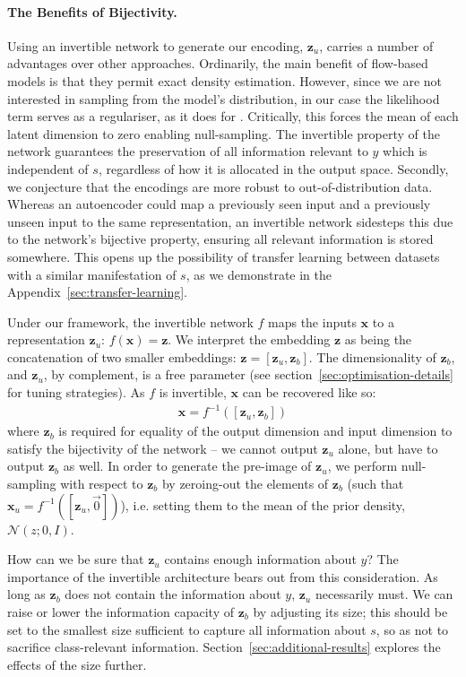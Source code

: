 \paragraph{The Benefits of Bijectivity.}
Using an invertible network to generate our encoding, $\bm{z}_u$, carries a number of advantages over other approaches.
Ordinarily, the main benefit of flow-based models is that they permit exact density estimation. 
However, since we are not interested in sampling from the model's distribution, in our case the likelihood term serves as a regulariser, as it does for  \citet{JacSmeOya18}. 
Critically, this forces the mean of each latent dimension to zero enabling null-sampling. 
The invertible property of the network guarantees the preservation of all information relevant to $y$ which is independent of $s$, regardless of how it is allocated in the output space.
Secondly, we conjecture that the encodings are more robust to out-of-distribution data.
Whereas an autoencoder could map a previously seen input and a previously unseen input to the same representation,
an invertible network sidesteps this due to the network's bijective property, ensuring all relevant information is stored somewhere. This opens up the possibility of transfer learning between datasets with a similar manifestation of $s$, as we demonstrate in the Appendix~\ref{sec:transfer-learning}.

Under our framework, the invertible network $f$ maps the inputs $\bm{x}$ to a representation $\bm{z}_u$:
$f(\bm{x}) = \bm{z}$.
We interpret the embedding $\bm{z}$ as being the concatenation of two smaller embeddings: $\bm{z} = [\bm{z}_u, \bm{z}_b]$.
The dimensionality of $\bm{z}_b$, and $\bm{z}_u$, by complement, is a free parameter (see section~\ref{sec:optimisation-details} for tuning strategies).
As $f$ is invertible, $\bm{x}$ can be recovered like so:
\begin{align}
  \bm{x} = f^{-1}([\bm{z}_u, \bm{z}_b])
  \label{eq:zreconstruct}
\end{align}
where $\bm{z}_b$ is required for equality of the output dimension and input dimension to satisfy the bijectivity of the network -- we cannot output $\bm{z}_u$ alone, but have to output $\bm{z}_b$ as well. In order to generate the pre-image of $\bm{z}_u$, we perform null-sampling with respect to $\bm{z}_b$ by zeroing-out the elements of $\bm{z}_b$ (such that $\bm{x}_{u} = f^{-1}([\bm{z}_{u}, \stackrel{\rightarrow}{0}])$), i.e. setting them to the mean of the prior density, $\mathcal{N}(z;0, I)$.

How can we be sure that $\bm{z}_u$ contains enough information about $y$?
The importance of the invertible architecture bears out from this consideration. %
As long as $\bm{z}_b$ does not contain the information about $y$, $\bm{z}_u$ necessarily must.
We can raise or lower the information capacity of $\bm{z}_b$ by adjusting its size;
this should be set to the smallest size sufficient to capture all information about $s$, so as not to sacrifice class-relevant information.
Section~\ref{sec:additional-results} explores the effects of the size further.

